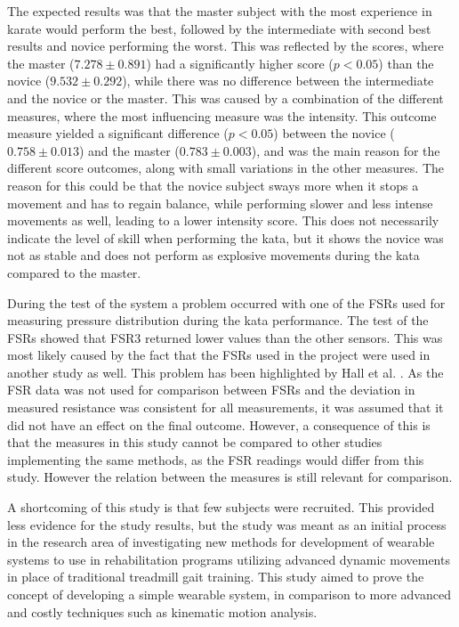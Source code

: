 
The expected results was that the master subject with the most experience in karate would perform the best, followed by the intermediate with second best results and novice performing the worst. This was reflected by the scores, where the master ($7.278 \pm 0.891$) had a significantly higher score ($p<0.05$) than the novice ($9.532 \pm 0.292$), while there was no difference between the intermediate and the novice or the master. This was caused by a combination of the different measures, where the most influencing measure was the intensity. This outcome measure yielded a significant difference ($p<0.05$) between the novice ($0.758 \pm 0.013$) and the master ($0.783 \pm 0.003$), and was the main reason for the different score outcomes, along with small variations in the other measures. The reason for this could be that the novice subject sways more when it stops a movement and has to regain balance, while performing slower and less intense movements as well, leading to a lower intensity score. This does not necessarily indicate the level of skill when performing the kata, but it shows the novice was not as stable and does not perform as explosive movements during the kata compared to the master.

During the test of the system a problem occurred with one of the FSRs used for measuring pressure distribution during the kata performance. The test of the FSRs showed that FSR3 returned lower values than the other sensors. This was most likely caused by the fact that the FSRs used in the project were used in another study as well. This problem has been highlighted by Hall et al. \cite{Hall2008}. As the FSR data was not used for comparison between FSRs and the deviation in measured resistance was consistent for all measurements, it was assumed that it did not have an effect on the final outcome. However, a consequence of this is that the measures in this study cannot be compared to other studies implementing the same methods, as the FSR readings would differ from this study. However the relation between the measures is still relevant for comparison.

A shortcoming of this study is that few subjects were recruited. This provided less evidence for the study results, but the study was meant as an initial process in the research area of investigating new methods for development of wearable systems to use in rehabilitation programs utilizing advanced dynamic movements in place of traditional treadmill gait training. This study aimed to prove the concept of developing a simple wearable system, in comparison to more advanced and costly techniques such as kinematic motion analysis. 


